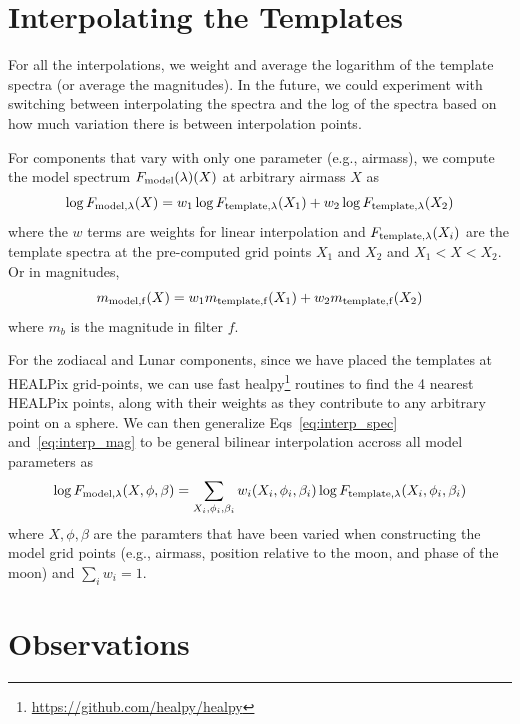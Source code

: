 \documentclass[]{spie}
\begin{document}
\section{Interpolating the Templates}\label{sec:interp}

For all the interpolations, we weight and average the logarithm of the template spectra (or average the magnitudes).  In the future, we could experiment with switching between interpolating the spectra and the log of the spectra based on how much variation there is between interpolation points.  

For components that vary with only one parameter (e.g., airmass), we compute the model spectrum $F_{\rm{model}}(\lambda)(X)$ at arbitrary airmass $X$ as
\begin{equation} \label{eq:interp_spec}
\log{F_{\rm{model},\lambda}(X)} = w_1 \log{F_{\rm{template},\lambda}(X_1)} + w_2\log{F_{\rm{template,\lambda}}(X_2)}
\end{equation}
where the $w$ terms are weights for linear interpolation and $F_{\rm{template},\lambda}(X_i)$ are the template spectra at the pre-computed grid points $X_1$ and $X_2$ and $X_1 < X < X_2$.    Or in magnitudes,
\begin{equation}\label{eq:interp_mag}
m_{\rm{model},f}(X) = w_1 m_{\rm{template},f}(X_1) + w_2 m_{\rm{template},f}(X_2)
\end{equation}
where $m_b$ is the magnitude in filter $f$.


For the zodiacal and Lunar components, since we have placed the templates at HEALPix grid-points, we can use fast healpy\footnote{\url{https://github.com/healpy/healpy}} routines to find the 4 nearest HEALPix points, along with their weights as they contribute to any arbitrary point on a sphere.  We can then generalize Eqs~\ref{eq:interp_spec} and~\ref{eq:interp_mag} to be general bilinear interpolation accross all model parameters as
\begin{equation}
\log{F_{\rm{model},\lambda}(X, \phi, \beta)} = \sum_{X_i, \phi_i, \beta_i} w_i(X_i, \phi_i, \beta_i) \log{F_{\rm{template,\lambda}}(X_i, \phi_i, \beta_i)}
\end{equation}
where $X, \phi, \beta$ are the paramters that have been varied when constructing the model grid points (e.g., airmass, position relative to the moon, and phase of the moon) and $\sum_i w_i = 1$. 

\section{Observations}\label{sec:obs}
\end{document}
